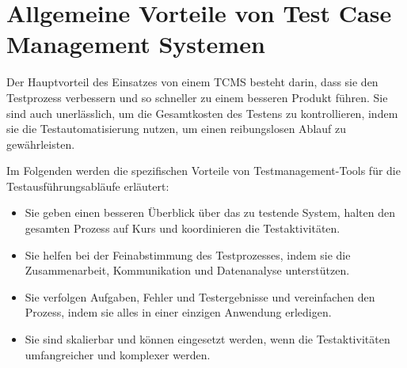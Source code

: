 \documentclass[a4paper, fontsize=11pt, parskip=half, twoside]{scrreprt}
\begin{document}
	
	
	
	
	\section{Allgemeine Vorteile von Test Case Management Systemen}
	Der Hauptvorteil des Einsatzes von einem \ac{TCMS} besteht darin, dass sie den Testprozess verbessern und so schneller zu einem besseren Produkt führen. 
	Sie sind auch unerlässlich, um die Gesamtkosten des Testens zu kontrollieren, indem sie die Testautomatisierung nutzen, um einen reibungslosen Ablauf zu gewährleisten.  
	
	Im Folgenden werden die spezifischen Vorteile von Testmanagement-Tools für die Testausführungsabläufe erläutert:
	
	\begin{itemize}
		\item Sie geben einen besseren Überblick über das zu testende System, halten den gesamten Prozess auf Kurs und koordinieren die Testaktivitäten.
		\item Sie helfen bei der Feinabstimmung des Testprozesses, indem sie die Zusammenarbeit, Kommunikation und Datenanalyse unterstützen.
		\item Sie verfolgen Aufgaben, Fehler und Testergebnisse und vereinfachen den Prozess, indem sie alles in einer einzigen Anwendung erledigen.
		\item Sie sind skalierbar und können eingesetzt werden, wenn die Testaktivitäten umfangreicher und komplexer werden.
	\end{itemize}

	\textcite{lead_articles_nodate}
	
\end{document}
